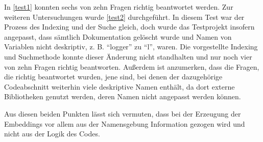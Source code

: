 \documentclass[../main.tex]{subfiles}
\begin{document}
In \ref{test1} konnten sechs von zehn Fragen richtig beantwortet werden.
Zur weiteren Untersuchungen wurde \ref{test2} durchgeführt.
In diesem Test war der Prozess des Indexing und der Suche gleich, doch wurde das Testprojekt insofern angepasst, dass sämtlich Dokumentation gelöscht wurde und Namen von Variablen nicht deskriptiv, z. B. \enquote{logger} zu \enquote{l}, waren.
Die vorgestellte Indexing und Suchmethode konnte dieser Änderung nicht standhalten und nur noch vier von zehn Fragen richtig beantworten.
Außerdem ist anzumerken, dass die Fragen, die richtig beantwortet wurden, jene sind, bei denen der dazugehörige Codeabschnitt weiterhin viele deskriptive Namen enthält, da dort externe Bibliotheken genutzt werden, deren Namen nicht angepasst werden können.


Aus diesen beiden Punkten lässt sich vermuten, dass bei der Erzeugung der Embeddings vor allem aus der Namensgebung Information gezogen wird und nicht aus der Logik des Codes.
\end{document}
